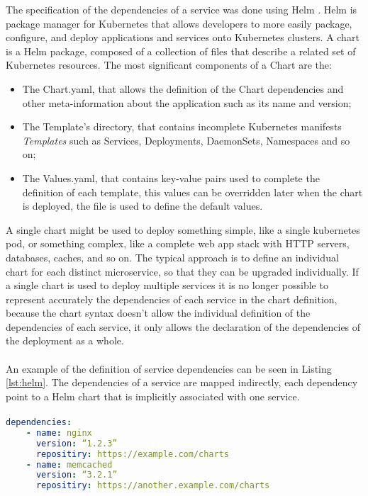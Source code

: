 The specification of the dependencies of a service was done using Helm \cite{helm}.
Helm is package manager for Kubernetes that allows developers to more easily package, configure, and deploy applications and services onto Kubernetes clusters.
A chart is a Helm package, composed of a collection of files that describe a related set of Kubernetes resources.
The most significant components of a Chart are the:
\begin{itemize}
    \item The Chart.yaml, that allows the definition of the Chart dependencies and other meta-information about the application such as its name and version;
    \item The Template's directory, that contains incomplete Kubernetes manifests \textit{Templates} such as Services, Deployments, DaemonSets, Namespaces and so on;
    \item The Values.yaml, that contains key-value pairs used to complete the definition of each template, this values can be overridden later when the chart is deployed, the file is used to define the default values.
\end{itemize}
A single chart might be used to deploy something simple, like a single kubernetes pod, or something complex, like a complete web app stack with HTTP servers, databases, caches, and so on.
The typical approach is to define an individual chart for each distinct microservice, so that they can be upgraded individually.
If a single chart is used to deploy multiple services it is no longer possible to represent accurately the dependencies of each service
in the chart definition, because the chart syntax doesn't allow the individual definition of the dependencies of each service, it only allows the declaration of the dependencies of the deployment as a whole.

\paragraph{}

An example of the definition of service dependencies can be seen in Listing \ref{lst:helm}.
The dependencies of a service are mapped indirectly, each dependency point to a Helm chart that is implicitly associated with one service.

\paragraph{}

\begin{lstlisting}[language=yaml, caption=Chart.yaml example, label=lst:helm]
dependencies:
    - name: nginx
      version: “1.2.3”
      repositiry: https://example.com/charts
    - name: memcached
      version: “3.2.1”
      repositiry: https://another.example.com/charts
\end{lstlisting}

